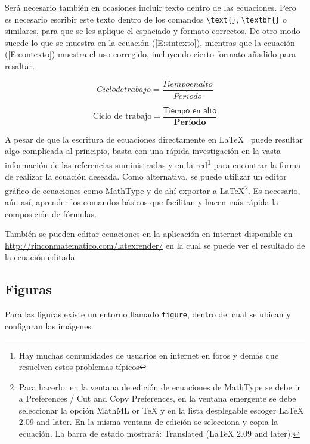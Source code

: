 \documentclass[12pt,letterpaper]{article}
\begin{document}
Será necesario también en ocasiones incluir texto dentro de las ecuaciones. Pero es necesario escribir este texto dentro de los comandos \verb+\text{}+, \verb+\textbf{}+ o similares, para que se les aplique el espaciado y formato correctos. De otro modo sucede lo que se muestra en la ecuación (\ref{E:sintexto}), mientras que la ecuación (\ref{E:contexto}) muestra el uso corregido, incluyendo cierto formato añadido para resaltar.

\begin{equation}\label{E:sintexto}
Ciclo de trabajo = \frac{Tiempo en alto}{Per\acute{i}odo}
\end{equation}

\begin{equation}\label{E:contexto}
\text{Ciclo de trabajo} = \frac{\textsf{Tiempo en alto}}{\textbf{Per\'{i}odo}}
\end{equation}

A pesar de que la escritura de ecuaciones directamente en \LaTeX~ puede resultar algo complicada al principio, basta con una rápida investigación en la vasta información de las referencias suministradas y en la red\footnote{Hay muchas comunidades de usuarios en internet en foros y demás que resuelven estos problemas típicos} para encontrar la forma de realizar la ecuación deseada. Como alternativa, se puede utilizar un editor gráfico de ecuaciones como \href{http://www.dessci.com/en/products/mathtype/}{MathType} y de ahí exportar a \LaTeX\footnote{Para hacerlo: en la ventana de edición de ecuaciones de MathType se debe ir a \textsf{Preferences / Cut and Copy Preferences}, en la ventana emergente se debe seleccionar la opción \textsf{MathML or TeX} y en la lista desplegable escoger \textsf{LaTeX 2.09 and later}. En la misma ventana de edición se selecciona y copia la ecuación. La barra de estado mostrará: \textsf{Translated (LaTeX 2.09 and later)}.}. Es necesario, aún así, aprender los comandos básicos que facilitan y hacen más rápida la composición de fórmulas.

También se pueden editar ecuaciones en la aplicación en internet disponible en \url{http://rinconmatematico.com/latexrender/} en la cual se puede ver el resultado de la ecuación editada.

\subsection{Figuras}\label{S:Figuras}

Para las figuras existe un entorno llamado \verb+figure+, dentro del cual se ubican y configuran las imágenes.
\end{document}
